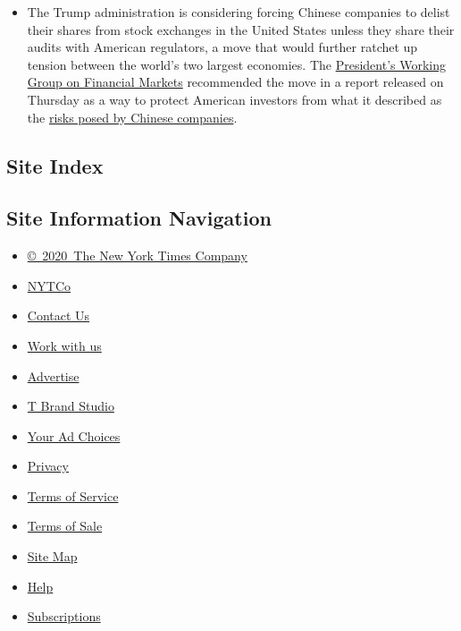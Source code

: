 \begin{itemize}
\item
  The Trump administration is considering forcing Chinese companies to
  delist their shares from stock exchanges in the United States unless
  they share their audits with American regulators, a move that would
  further ratchet up tension between the world's two largest economies.
  The
  \href{https://www.nytimes.com/live/2020/08/06/business/stock-market-today-coronavirus/us-may-insist-chinese-companies-share-audits-or-delist-their-shares-from-american-exchanges}{President's
  Working Group on Financial Markets} recommended the move in a report
  released on Thursday as a way to protect American investors from what
  it described as the
  \href{https://www.nytimes.com/2012/07/13/business/in-china-inspecting-the-inspectors.html}{risks
  posed by Chinese companies}.
\end{itemize}

\hypertarget{site-index}{%
\subsection{Site Index}\label{site-index}}

\hypertarget{site-information-navigation}{%
\subsection{Site Information
Navigation}\label{site-information-navigation}}

\begin{itemize}
\tightlist
\item
  \href{https://help.nytimes.com/hc/en-us/articles/115014792127-Copyright-notice}{©~2020~The
  New York Times Company}
\end{itemize}

\begin{itemize}
\tightlist
\item
  \href{https://www.nytco.com/}{NYTCo}
\item
  \href{https://help.nytimes.com/hc/en-us/articles/115015385887-Contact-Us}{Contact
  Us}
\item
  \href{https://www.nytco.com/careers/}{Work with us}
\item
  \href{https://nytmediakit.com/}{Advertise}
\item
  \href{http://www.tbrandstudio.com/}{T Brand Studio}
\item
  \href{https://www.nytimes.com/privacy/cookie-policy\#how-do-i-manage-trackers}{Your
  Ad Choices}
\item
  \href{https://www.nytimes.com/privacy}{Privacy}
\item
  \href{https://help.nytimes.com/hc/en-us/articles/115014893428-Terms-of-service}{Terms
  of Service}
\item
  \href{https://help.nytimes.com/hc/en-us/articles/115014893968-Terms-of-sale}{Terms
  of Sale}
\item
  \href{https://spiderbites.nytimes.com}{Site Map}
\item
  \href{https://help.nytimes.com/hc/en-us}{Help}
\item
  \href{https://www.nytimes.com/subscription?campaignId=37WXW}{Subscriptions}
\end{itemize}
